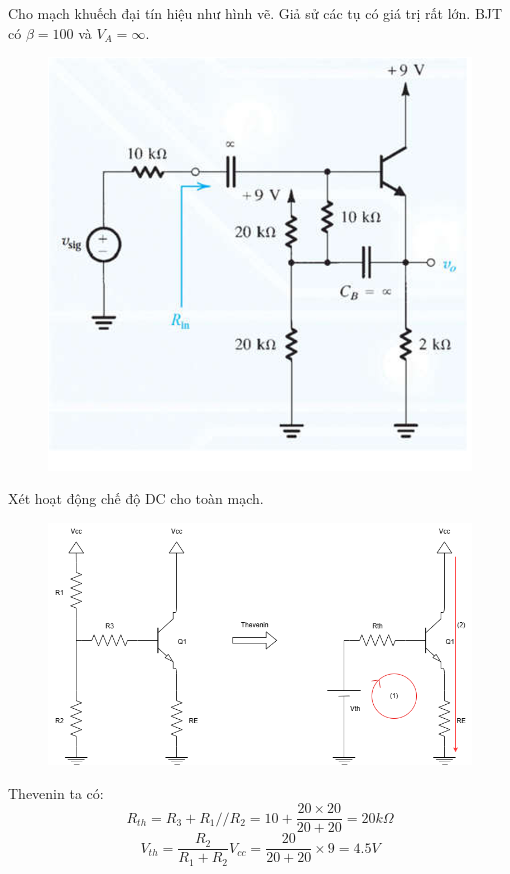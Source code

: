 
Cho mạch khuếch đại tín hiệu như hình vẽ. Giả sử các tụ có giá trị rất lớn. BJT có $\beta = 100$ và $V_{A} = \infty$.

\begin{figure}[H]
	\centering
	\includegraphics[width=.8\linewidth]{./my-chapters/my-images/Question4/Debai.png}
\end{figure}


\noindent Xét hoạt động chế độ DC cho toàn mạch.

\begin{figure}[H]
	\centering
	\includegraphics[width=.7\linewidth]{./my-chapters/my-diagrams/Question4/Debai.png}
\end{figure}

	Thevenin ta có:
\[ R_{th} = R_{3} + R_{1}//R_{2} = 10 + \dfrac{20\times 20}{20 + 20} = 20k\Omega\]
\[ V_{th} = \dfrac{R_{2}}{R_{1} + R_{2}} V_{cc} = \dfrac{20}{20+20} \times 9 = 4.5V\]

